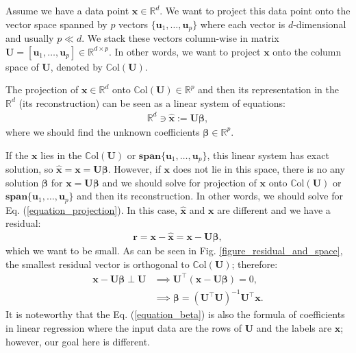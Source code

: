 \documentclass[lang=cn,10pt]{gorgeousnbook}
\numberwithin{equation}{section}%
\numberwithin{figure}{section}%
\begin{document}
Assume we have a data point $\boldsymbol{x} \in \mathbb{R}^d$. We want to project this data point onto the vector space spanned by $p$ vectors $\{\boldsymbol{u}_1, \dots, \boldsymbol{u}_p\}$ where each vector is $d$-dimensional and usually $p \ll d$. We stack these vectors column-wise in matrix $\boldsymbol{U} = [\boldsymbol{u}_1, \dots, \boldsymbol{u}_p] \in \mathbb{R}^{d \times p}$. In other words, we want to project $\boldsymbol{x}$ onto the column space of $\boldsymbol{U}$, denoted by $\mathbb{C}\text{ol}(\boldsymbol{U})$.

The projection of $\boldsymbol{x} \in \mathbb{R}^d$ onto $\mathbb{C}\text{ol}(\boldsymbol{U}) \in \mathbb{R}^p$ and then its representation in the $\mathbb{R}^d$ (its reconstruction) can be seen as a linear system of equations:
\begin{align}\label{equation_projection}
\mathbb{R}^d \ni \widehat{\boldsymbol{x}} := \boldsymbol{U \beta},
\end{align}
where we should find the unknown coefficients $\boldsymbol{\beta} \in \mathbb{R}^p$. 

If the $\boldsymbol{x}$ lies in the $\mathbb{C}\text{ol}(\boldsymbol{U})$ or $\textbf{span}\{\boldsymbol{u}_1, \dots, \boldsymbol{u}_p\}$, this linear system has exact solution, so $\widehat{\boldsymbol{x}} = \boldsymbol{x} = \boldsymbol{U \beta}$. However, if $\boldsymbol{x}$ does not lie in this space, there is no any solution $\boldsymbol{\beta}$ for $\boldsymbol{x} = \boldsymbol{U \beta}$ and we should solve for projection of $\boldsymbol{x}$ onto $\mathbb{C}\text{ol}(\boldsymbol{U})$ or $\textbf{span}\{\boldsymbol{u}_1, \dots, \boldsymbol{u}_p\}$ and then its reconstruction. In other words, we should solve for Eq. (\ref{equation_projection}). In this case, $\widehat{\boldsymbol{x}}$ and $\boldsymbol{x}$ are different and we have a residual:
\begin{align}\label{equation_residual_1}
\boldsymbol{r} = \boldsymbol{x} - \widehat{\boldsymbol{x}} = \boldsymbol{x} - \boldsymbol{U \beta},
\end{align}
which we want to be small. As can be seen in Fig. \ref{figure_residual_and_space}, the smallest residual vector is orthogonal to $\mathbb{C}\text{ol}(\boldsymbol{U})$; therefore:
\begin{align}
\boldsymbol{x} - \boldsymbol{U\beta} \perp \boldsymbol{U} &\implies \boldsymbol{U}^\top (\boldsymbol{x} - \boldsymbol{U \beta}) = 0, \nonumber \\
& \implies \boldsymbol{\beta} = (\boldsymbol{U}^\top \boldsymbol{U})^{-1} \boldsymbol{U}^\top \boldsymbol{x}. \label{equation_beta}
\end{align}
It is noteworthy that the Eq. (\ref{equation_beta}) is also the formula of coefficients in linear regression \cite{friedman2001elements} where the input data are the rows of $\boldsymbol{U}$ and the labels are $\boldsymbol{x}$; however, our goal here is different. 
\end{document}
